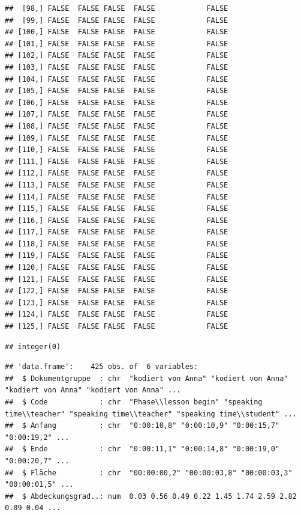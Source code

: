 \documentclass[
  english,
  man,floatsintext]{apa6}
\begin{document}
\begin{verbatim}
##  [98,] FALSE  FALSE FALSE  FALSE            FALSE
##  [99,] FALSE  FALSE FALSE  FALSE            FALSE
## [100,] FALSE  FALSE FALSE  FALSE            FALSE
## [101,] FALSE  FALSE FALSE  FALSE            FALSE
## [102,] FALSE  FALSE FALSE  FALSE            FALSE
## [103,] FALSE  FALSE FALSE  FALSE            FALSE
## [104,] FALSE  FALSE FALSE  FALSE            FALSE
## [105,] FALSE  FALSE FALSE  FALSE            FALSE
## [106,] FALSE  FALSE FALSE  FALSE            FALSE
## [107,] FALSE  FALSE FALSE  FALSE            FALSE
## [108,] FALSE  FALSE FALSE  FALSE            FALSE
## [109,] FALSE  FALSE FALSE  FALSE            FALSE
## [110,] FALSE  FALSE FALSE  FALSE            FALSE
## [111,] FALSE  FALSE FALSE  FALSE            FALSE
## [112,] FALSE  FALSE FALSE  FALSE            FALSE
## [113,] FALSE  FALSE FALSE  FALSE            FALSE
## [114,] FALSE  FALSE FALSE  FALSE            FALSE
## [115,] FALSE  FALSE FALSE  FALSE            FALSE
## [116,] FALSE  FALSE FALSE  FALSE            FALSE
## [117,] FALSE  FALSE FALSE  FALSE            FALSE
## [118,] FALSE  FALSE FALSE  FALSE            FALSE
## [119,] FALSE  FALSE FALSE  FALSE            FALSE
## [120,] FALSE  FALSE FALSE  FALSE            FALSE
## [121,] FALSE  FALSE FALSE  FALSE            FALSE
## [122,] FALSE  FALSE FALSE  FALSE            FALSE
## [123,] FALSE  FALSE FALSE  FALSE            FALSE
## [124,] FALSE  FALSE FALSE  FALSE            FALSE
## [125,] FALSE  FALSE FALSE  FALSE            FALSE
\end{verbatim}

\begin{verbatim}
## integer(0)
\end{verbatim}

\begin{verbatim}
## 'data.frame':    425 obs. of  6 variables:
##  $ Dokumentgruppe  : chr  "kodiert von Anna" "kodiert von Anna" "kodiert von Anna" "kodiert von Anna" ...
##  $ Code            : chr  "Phase\\lesson begin" "speaking time\\teacher" "speaking time\\teacher" "speaking time\\student" ...
##  $ Anfang          : chr  "0:00:10,8" "0:00:10,9" "0:00:15,7" "0:00:19,2" ...
##  $ Ende            : chr  "0:00:11,1" "0:00:14,8" "0:00:19,0" "0:00:20,7" ...
##  $ Fläche          : chr  "00:00:00,2" "00:00:03,8" "00:00:03,3" "00:00:01,5" ...
##  $ Abdeckungsgrad..: num  0.03 0.56 0.49 0.22 1.45 1.74 2.59 2.82 0.09 0.04 ...
\end{verbatim}
\end{document}
